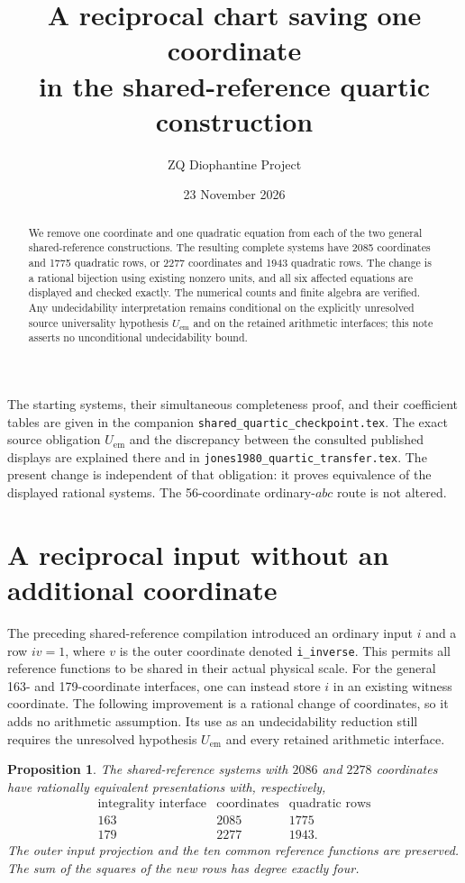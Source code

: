 \documentclass[11pt]{article}
\title{A reciprocal chart saving one coordinate\\in the shared-reference quartic construction}
\author{ZQ Diophantine Project}
\date{23 November 2026}
\newtheorem{proposition}{Proposition}
\begin{document}
\maketitle
\begin{abstract}
We remove one coordinate and one quadratic equation from each of the two
general shared-reference constructions. The resulting complete systems
have 2085 coordinates and 1775 quadratic rows, or 2277 coordinates and 1943
quadratic rows. The change is a rational bijection using existing nonzero
units, and all six affected equations are displayed and checked exactly.
The numerical counts and finite algebra are verified. Any undecidability
interpretation remains conditional on the explicitly unresolved source
universality hypothesis \(U_{\mathrm{em}}\) and on the retained arithmetic
interfaces; this note asserts no unconditional undecidability bound.
\end{abstract}

The starting systems, their simultaneous completeness proof, and their
coefficient tables are given in the companion
\nolinkurl{shared_quartic_checkpoint.tex}. The exact source obligation
\(U_{\mathrm{em}}\) and the discrepancy between the consulted published
displays are explained there and in
\nolinkurl{jones1980_quartic_transfer.tex}. The present change is independent
of that obligation: it proves equivalence of the displayed rational
systems. The 56-coordinate ordinary-\(abc\) route is not altered.

\section{A reciprocal input without an additional coordinate}
\label{sec:reciprocal-reference-rechart}

The preceding shared-reference compilation introduced an ordinary input
\(i\) and a row \(iv=1\), where \(v\) is the outer coordinate denoted
\texttt{i\_inverse}.  This permits all reference functions to be shared
in their actual physical scale.  For the general 163- and 179-coordinate
interfaces, one can instead store \(i\) in an existing witness coordinate.
The following improvement is a rational change of coordinates, so it adds
no arithmetic assumption.  Its use as an undecidability reduction still
requires the unresolved hypothesis \(U_{\mathrm{em}}\) and every retained
arithmetic interface.

\begin{proposition}\label{prop:reciprocal-reference-rechart}
The shared-reference systems with \(2086\) and \(2278\) coordinates have
rationally equivalent presentations with, respectively,
\[
\begin{array}{c|cc}
\text{integrality interface}&\text{coordinates}&\text{quadratic rows}\\\hline
163&2085&1775\\
179&2277&1943.
\end{array}
\]
The outer input projection and the ten common reference functions are
preserved.  The sum of the squares of the new rows has degree exactly four.
\end{proposition}
\end{document}
